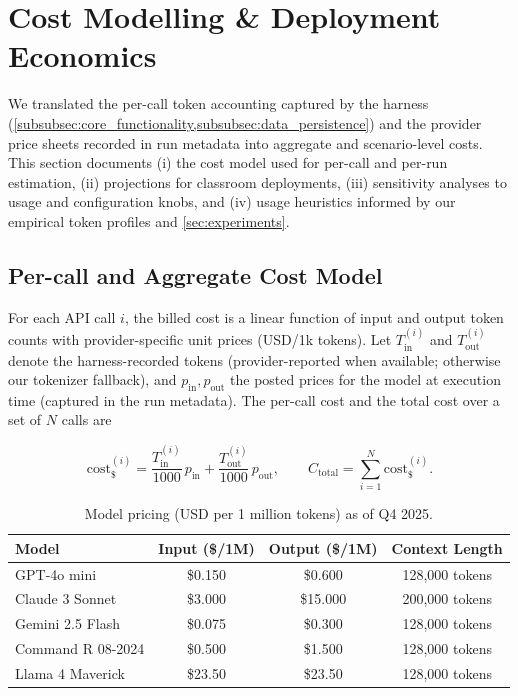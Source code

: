 \section{Cost Modelling \& Deployment Economics}\label{sec:cost_modelling}

We translated the per-call token accounting captured by the harness (\cref{subsubsec:core_functionality,subsubsec:data_persistence}) and the provider price sheets recorded in run metadata into aggregate and scenario-level costs. This section documents (i) the cost model used for per-call and per-run estimation, (ii) projections for classroom deployments, (iii) sensitivity analyses to usage and configuration knobs, and (iv) usage heuristics informed by our empirical token profiles and \cref{sec:experiments}.

\subsection{Per-call and Aggregate Cost Model}\label{subsec:total_cost_formula}

For each API call $i$, the billed cost is a linear function of input and output token counts with provider-specific unit prices (USD/1k tokens). Let $T^{(i)}_{\text{in}}$ and $T^{(i)}_{\text{out}}$ denote the harness-recorded tokens (provider-reported when available; otherwise our tokenizer fallback), and $p_{\text{in}}, p_{\text{out}}$ the posted prices for the model at execution time (captured in the run metadata). The per-call cost and the total cost over a set of $N$ calls are

\begin{equation}
\label{eq:per_call_cost}
\mathrm{cost}^{(i)}_{\$} 
= \frac{T^{(i)}_{\text{in}}}{1000}\, p_{\text{in}} 
 + \frac{T^{(i)}_{\text{out}}}{1000}\, p_{\text{out}}, \qquad
 C_{\text{total}} = \sum_{i=1}^N \mathrm{cost}^{(i)}_{\$}.
\end{equation}

\begin{table}[t]
\centering
\caption{Model pricing (USD per 1 million tokens) as of Q4 2025.}
\label{tab:model_pricing_details}
\begin{tabularx}{\textwidth}{@{}l c c c@{}}
\toprule
\textbf{Model} & \textbf{Input (\$/1M)} & \textbf{Output (\$/1M)} & \textbf{Context Length} \\ \midrule
GPT-4o mini & \$0.150 & \$0.600 & 128,000 tokens \\
Claude 3 Sonnet & \$3.000 & \$15.000 & 200,000 tokens \\
Gemini 2.5 Flash & \$0.075 & \$0.300 & 128,000 tokens \\
Command R 08-2024 & \$0.500 & \$1.500 & 128,000 tokens \\
Llama 4 Maverick & \$23.50 & \$23.50 & 128,000 tokens \\ \bottomrule
\end{tabularx}
\end{table}

